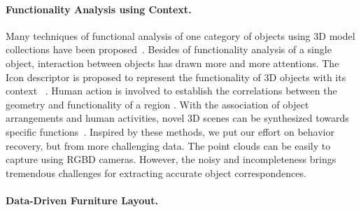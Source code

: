 \paragraph{Functionality Analysis using Context.}
Many techniques of functional analysis of one category of objects using 3D model collections have been proposed~\cite{Huang2014,Su2014_3dattributes}. 
Besides of functionality analysis of a single object, interaction between objects has drawn more and more attentions.
The Icon descriptor is proposed to represent the functionality of 3D objects with its context ~\cite{HuICON2015}.
%
Human action is involved to establish the correlations between the geometry and functionality of a region \cite{savva2014scenegrok}.  
%
With the association of object arrangements and human activities, novel 3D scenes can be synthesized towards specific functions~\cite{fisher2015actsynth}.  
%
Inspired by these methods, we put our effort on behavior recovery, but from more challenging data.
%
The point clouds can be easily to capture using RGBD cameras. However, the noisy and incompleteness brings tremendous challenges for extracting accurate object correspondences.






\paragraph{Data-Driven Furniture Layout.}

